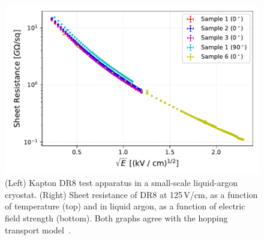 \begin{figure}[htbp]
\begin{minipage}[b]{.4\textwidth}
\includegraphics[width=\linewidth]{graphics/lartpc/FieldCage/ir2_efield.pdf}
\end{minipage}
\caption{(Left) Kapton DR8 test apparatus in a small-scale liquid-argon cryostat. (Right) Sheet resistance of DR8 at 125\,V/cm, as a function of temperature (top) and in liquid argon, as a function of electric field strength (bottom). Both graphs agree with the hopping transport model~\cite{hopping_transport}.}
\label{fig:dr8_studies}
\end{figure}

